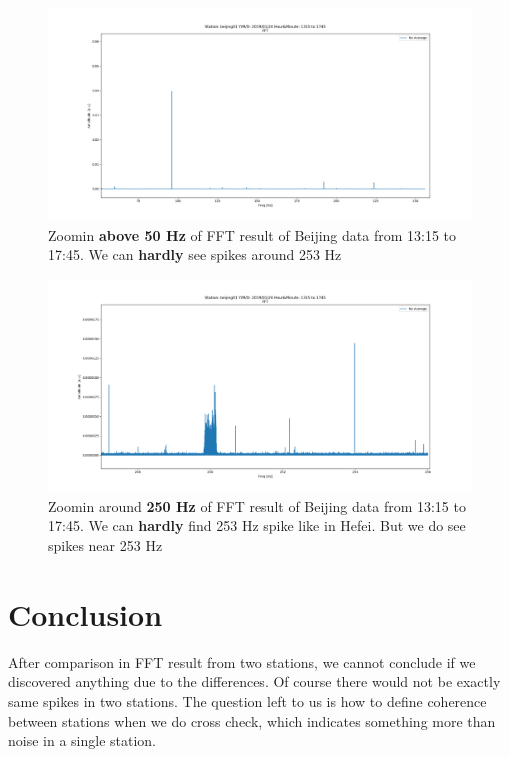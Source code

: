 \documentclass[
11pt, %
a4paper %
]{article}%
\theoremstyle{plain}
\begin{document}
\newpage
\begin{figure}[ht]
	\centering
	\includegraphics[width=\textwidth]{beijing2_2.png}
	\caption{Zoomin \textbf{above 50 Hz} of FFT result of Beijing data from 13:15 to 17:45. We can \textbf{hardly} see spikes around 253 Hz}
	\label{fig:beijing2_2}
\end{figure}
\newpage
\begin{figure}[htb]
	\centering
	\includegraphics[width=\textwidth]{beijing2_1.png}
	\caption{Zoomin around \textbf{250 Hz} of FFT result of Beijing data from 13:15 to 17:45. We can \textbf{hardly} find 253 Hz spike like in Hefei. But we do see spikes near 253 Hz}
	\label{fig:beijing2_1}
\end{figure}
\newpage
\section{Conclusion}
After comparison in FFT result from two stations, we cannot conclude if we discovered anything due to the differences. Of course there would not be exactly same spikes in two stations. The question left to us is how to define coherence between stations when we do cross check, which indicates something more than noise in a single station. \\

\end{document}
